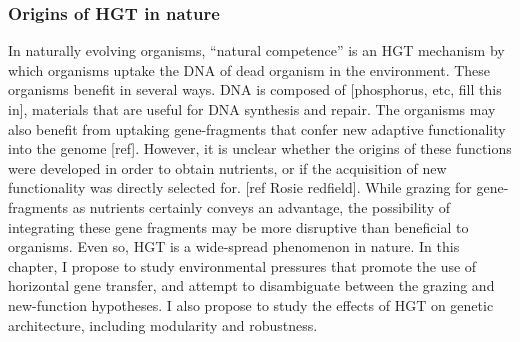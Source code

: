 \subsubsection{Origins of HGT in nature}

In naturally evolving organisms, “natural competence” is an HGT mechanism by which organisms uptake the DNA of dead organism in the environment. These organisms benefit in several ways. DNA is composed of [phosphorus, etc, fill this in], materials that are useful for DNA synthesis and repair. The organisms may also benefit from uptaking gene-fragments that confer new adaptive functionality into the genome [ref]. However, it is unclear whether the origins of these functions were developed in order to obtain nutrients, or if the acquisition of new functionality was directly selected for. [ref Rosie redfield]. While grazing for gene-fragments as nutrients certainly conveys an advantage, the possibility of integrating these gene fragments may be more disruptive than beneficial to organisms. Even so, HGT is a wide-spread phenomenon in nature.
In this chapter, I propose to study environmental pressures that promote the use of horizontal gene transfer, and attempt to disambiguate between the grazing and new-function hypotheses. I also propose to study the effects of HGT on genetic architecture, including modularity and robustness.